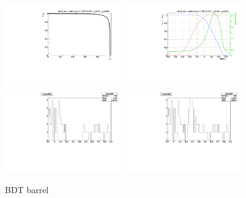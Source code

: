 \begin{figure}
  \centering
  \includegraphics[width=0.45\textwidth]{Figures/bdt/BDT_barrel_roc}
  \includegraphics[width=0.45\textwidth]{Figures/bdt/BDT_barrel_eff} \\
  \includegraphics[width=0.45\textwidth]{Figures/bdt/BDT_barrel_mass}
  \includegraphics[width=0.45\textwidth]{Figures/bdt/BDT_barrel_mass_unblind}
\caption{BDT barrel}
\end{figure}

